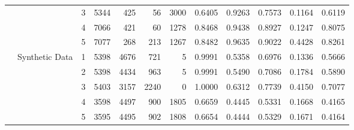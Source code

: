 \begin{table}[t]
{\begin{tabular}{|l|l|c|r|r|r|r|c|c|c|c|c|}
 &  & 3 & 5344 & 425 & 56 & 3000 & 0.6405 & 0.9263 & 0.7573 & 0.1164 & 0.6119 \\
 &  & 4 & 7066 & 421 & 60 & 1278 & 0.8468 & 0.9438 & 0.8927 & 0.1247 & 0.8075 \\
 &  & 5 & 7077 & 268 & 213 & 1267 & 0.8482 & 0.9635 & 0.9022 & 0.4428 & 0.8261 \\
\cline{2-12}
 & \multirow{5}{*}{Synthetic Data} & 1 & 5398 & 4676 & 721 & 5 & 0.9991 & 0.5358 & 0.6976 & 0.1336 & 0.5666 \\
 &  & 2 & 5398 & 4434 & 963 & 5 & 0.9991 & 0.5490 & 0.7086 & 0.1784 & 0.5890 \\
 &  & 3 & 5403 & 3157 & 2240 & 0 & 1.0000 & 0.6312 & 0.7739 & 0.4150 & 0.7077 \\
 &  & 4 & 3598 & 4497 & 900 & 1805 & 0.6659 & 0.4445 & 0.5331 & 0.1668 & 0.4165 \\
 &  & 5 & 3595 & 4495 & 902 & 1808 & 0.6654 & 0.4444 & 0.5329 & 0.1671 & 0.4164 \\
\hline
\end{tabular}
}
\end{table}

